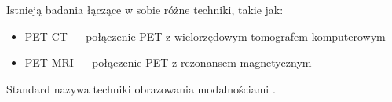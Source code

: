 Istnieją badania łączące w sobie różne techniki, takie jak:
\begin{itemize}
    \item PET-CT --- połączenie PET z wielorzędowym tomografem komputerowym
    \item PET-MRI --- połączenie PET z rezonansem magnetycznym
\end{itemize}

Standard \DICOM nazywa techniki obrazowania modalnościami .